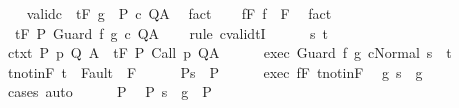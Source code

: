 \begin{isabellebody}
\ \ \isamarkupfalse%
\ valid{\isacharunderscore}c{\isacharcolon}\ {\isachardoublequoteopen}{\isasymGamma}{\isacharcomma}{\isasymTheta}\ {\isasymTurnstile}\isactrlsub t\isactrlbsub {\isacharslash}F\isactrlesub \ {\isacharparenleft}g\ {\isasyminter}\ P{\isacharparenright}\ c\ Q{\isacharcomma}A{\isachardoublequoteclose}\ \isamarkupfalse%
\ fact\isanewline
\ \ \isamarkupfalse%
\ f{\isacharunderscore}F{\isacharcolon}\ {\isachardoublequoteopen}f\ {\isasymin}\ F{\isachardoublequoteclose}\ \isamarkupfalse%
\ fact\isanewline
\ \ \isamarkupfalse%
\ {\isachardoublequoteopen}{\isasymGamma}{\isacharcomma}{\isasymTheta}\ {\isasymTurnstile}\isactrlsub t\isactrlbsub {\isacharslash}F\isactrlesub \ P\ Guard\ f\ g\ c\ Q{\isacharcomma}A{\isachardoublequoteclose}\isanewline
\ \ \isamarkupfalse%
\ {\isacharparenleft}rule\ cvalidtI{\isacharparenright}\isanewline
\ \ \ \ \isamarkupfalse%
\ s\ t\isanewline
\ \ \ \ \isamarkupfalse%
\ ctxt{\isacharcolon}\ {\isachardoublequoteopen}{\isasymforall}{\isacharparenleft}P{\isacharcomma}\ p{\isacharcomma}\ Q{\isacharcomma}\ A{\isacharparenright}{\isasymin}{\isasymTheta}{\isachardot}\ {\isasymGamma}\ {\isasymTurnstile}\isactrlsub t\isactrlbsub {\isacharslash}F\isactrlesub \ P\ {\isacharparenleft}Call\ p{\isacharparenright}\ Q{\isacharcomma}A{\isachardoublequoteclose}\isanewline
\ \ \ \ \isamarkupfalse%
\ exec{\isacharcolon}\ {\isachardoublequoteopen}{\isasymGamma}{\isasymturnstile}{\isasymlangle}Guard\ f\ g\ c{\isacharcomma}Normal\ s{\isasymrangle}\ {\isasymRightarrow}\ t{\isachardoublequoteclose}\isanewline
\ \ \ \ \isamarkupfalse%
\ t{\isacharunderscore}notin{\isacharunderscore}F{\isacharcolon}\ {\isachardoublequoteopen}t\ {\isasymnotin}\ Fault\ {\isacharbackquote}\ F{\isachardoublequoteclose}\isanewline
\ \ \ \ \isamarkupfalse%
\ P{\isacharcolon}{\isachardoublequoteopen}s\ {\isasymin}\ P{\isachardoublequoteclose}\isanewline
\ \ \ \ \isamarkupfalse%
\ exec\ f{\isacharunderscore}F\ t{\isacharunderscore}notin{\isacharunderscore}F\ \isamarkupfalse%
\ g{\isacharcolon}\ {\isachardoublequoteopen}s\ {\isasymin}\ g{\isachardoublequoteclose}\isanewline
\ \ \ \ \ \ \isamarkupfalse%
\ cases\ auto\isanewline
\ \ \ \ \isamarkupfalse%
\ P\ \isamarkupfalse%
\ P{\isacharprime}{\isacharcolon}\ {\isachardoublequoteopen}s\ {\isasymin}\ g\ {\isasyminter}\ P{\isachardoublequoteclose}\isanewline

\end{isabellebody}
